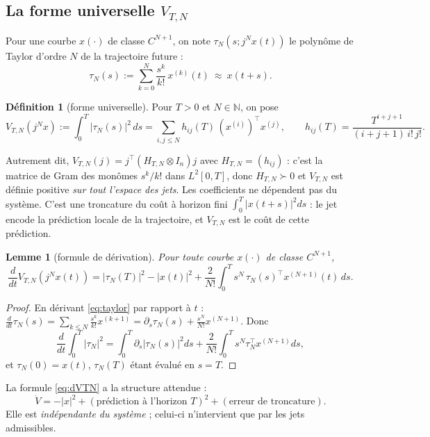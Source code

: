 \documentclass[11pt,a4paper]{article}
\newtheorem{lemma}[theorem]{Lemme}
\theoremstyle{definition}
\newtheorem{definition}[theorem]{Définition}
\theoremstyle{remark}
\newcommand{\N}{\mathbb{N}}
\newcommand{\jet}[2]{j^{#1}#2}
\newcommand{\tr}{^{\top}}
\begin{document}
\subsection{La forme universelle $V_{T,N}$}
Pour une courbe $x(\cdot)$ de classe $C^{N+1}$, on note $\tau_N(s;\jet{N}{x}(t))$ le polynôme de Taylor d'ordre $N$ de la trajectoire future :
\begin{equation}\label{eq:taylor}
\tau_N(s) := \sum_{k=0}^N \frac{s^k}{k!}\,x^{(k)}(t)\ \approx\ x(t+s).
\end{equation}
\begin{definition}[forme universelle]
Pour $T>0$ et $N\in\N$, on pose
\begin{equation}\label{eq:VTN}
V_{T,N}(\jet{N}{x}) := \int_0^T |\tau_N(s)|^2\,ds = \sum_{i,j\le N} h_{ij}(T)\,(x^{(i)})\tr x^{(j)},\qquad h_{ij}(T) = \frac{T^{i+j+1}}{(i+j+1)\,i!\,j!}.
\end{equation}
\end{definition}
Autrement dit, $V_{T,N}(j) = j\tr (H_{T,N}\otimes I_n) j$ avec $H_{T,N} = (h_{ij})$ : c'est la matrice de Gram des monômes $s^k/k!$ dans $L^2[0,T]$, donc $H_{T,N}\succ 0$ et $V_{T,N}$ est définie positive \emph{sur tout l'espace des jets}. Les coefficients ne dépendent pas du système. C'est une troncature du coût à horizon fini $\int_0^T|x(t+s)|^2ds$ : le jet encode la prédiction locale de la trajectoire, et $V_{T,N}$ est le coût de cette prédiction.

\begin{lemma}[formule de dérivation]\label{lem:dV}
Pour toute courbe $x(\cdot)$ de classe $C^{N+1}$,
\begin{equation}\label{eq:dVTN}
\frac{d}{dt}V_{T,N}(\jet{N}{x}(t)) = |\tau_N(T)|^2 - |x(t)|^2 + \frac{2}{N!}\int_0^T s^N\,\tau_N(s)\tr x^{(N+1)}(t)\,ds .
\end{equation}
\end{lemma}
\begin{proof}
En dérivant \eqref{eq:taylor} par rapport à $t$ : $\frac{d}{dt}\tau_N(s) = \sum_{k\le N}\frac{s^k}{k!}x^{(k+1)} = \partial_s\tau_N(s) + \frac{s^N}{N!}x^{(N+1)}$. Donc
\[\frac{d}{dt}\int_0^T|\tau_N|^2 = \int_0^T\partial_s|\tau_N(s)|^2ds + \frac{2}{N!}\int_0^T s^N\tau_N\tr x^{(N+1)}ds,\] et $\tau_N(0) = x(t)$, $\tau_N(T)$ étant évalué en $s=T$.
\end{proof}
La formule \eqref{eq:dVTN} a la structure attendue :
\[\dot V = -|x|^2 + (\text{prédiction à l'horizon }T)^2 + (\text{erreur de troncature}).\]
Elle est \emph{indépendante du système} ; celui-ci n'intervient que par les jets admissibles.
\end{document}
